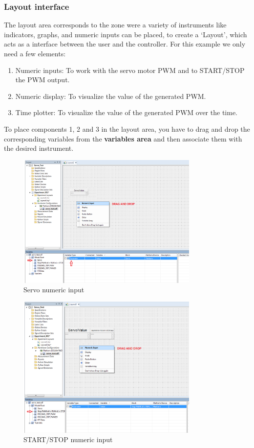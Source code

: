 \subsubsection{Layout interface}
The layout area corresponds to the zone were a variety of instruments like indicators, graphs, and numeric inputs can be placed, to create a ‘Layout’, which acts as a interface between the user and the controller.
For this example we only need a few elements:
\begin{enumerate}
    \item Numeric inputs: To work with the servo motor PWM and to START/STOP the PWM output.
    \item Numeric display: To visualize the value of the generated PWM.
    \item Time plotter: To visualize the value of the generated PWM over the time.
\end{enumerate}
To place components 1, 2 and 3 in the layout area, you have to drag and drop the corresponding variables from the \textbf{variables area} and then associate them with the desired instrument.
    \begin{figure}[H]
        \centering
        \includegraphics[width=0.8\textwidth]{Images/Ball and Bean/ControlDesk/CD10.png}
        \caption{Servo numeric input}
        \label{fig33}
    \end{figure}
    \begin{figure}[H]
        \centering
        \includegraphics[width=0.8\textwidth]{Images/Ball and Bean/ControlDesk/CD11.png}
        \caption{START/STOP numeric input}
        \label{fig34}
    \end{figure}
